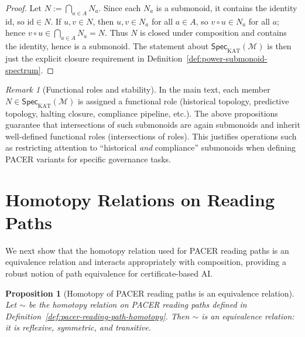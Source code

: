 \documentclass[11pt]{book}
\theoremstyle{plain}
\newtheorem{proposition}[theorem]{Proposition}
\theoremstyle{definition}
\theoremstyle{remark}
\newtheorem{remark}[theorem]{Remark}
\begin{document}
\begin{proof}
Let $N:=\bigcap_{a\in A}N_a$. Since each $N_a$ is a submonoid, it
contains the identity $\mathrm{id}$, so $\mathrm{id}\in N$. If $u,v\in
N$, then $u,v\in N_a$ for all $a\in A$, so $v\circ u\in N_a$ for all
$a$; hence $v\circ u\in\bigcap_{a\in A}N_a=N$. Thus $N$ is closed
under composition and contains the identity, hence is a submonoid. The
statement about $\mathsf{Spec}_{\mathrm{KAT}}(\mathcal{M})$ is then
just the explicit closure requirement in
Definition~\ref{def:power-submonoid-spectrum}.
\end{proof}

\begin{remark}[Functional roles and stability]
\label{rem:functional-roles-stability}
In the main text, each member $N\in\mathsf{Spec}_{\mathrm{KAT}}(\mathcal{M})$
is assigned a functional role (historical topology, predictive
topology, halting closure, compliance pipeline, etc.). The above
propositions guarantee that intersections of such submonoids are again
submonoids and inherit well-defined functional roles (intersections of
roles). This justifies operations such as restricting attention to
``historical \emph{and} compliance'' submonoids when defining PACER
variants for specific governance tasks.
\end{remark}

\section{Homotopy Relations on Reading Paths}

We next show that the homotopy relation used for PACER reading paths
is an equivalence relation and interacts appropriately with
composition, providing a robust notion of path equivalence for
certificate-based AI.

\begin{proposition}[Homotopy of PACER reading paths is an equivalence relation]
\label{prop:pacer-homotopy-equivalence}
Let $\sim$ be the homotopy relation on PACER reading paths defined in
Definition~\ref{def:pacer-reading-path-homotopy}. Then $\sim$ is an
equivalence relation: it is reflexive, symmetric, and transitive.
\end{proposition}
\end{document}
